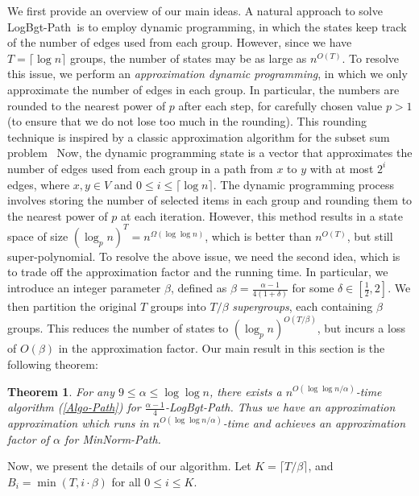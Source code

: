 \documentclass[11pt,a4paper]{article} \usepackage{enumitem}
\newcommand{\minnormpath}{\textsf{MinNorm-Path}}
\newcommand{\LBOpath}{\textsf{LogBgt-Path}}
\newtheorem{theorem}{Theorem}[section]
\theoremstyle{definition}
\begin{document}
We first provide an overview of our main ideas.
A natural approach to solve \LBOpath\ is to employ dynamic programming, 
in which the states keep track of the number of edges used from each group.
However, since we have $T=\lceil \log n\rceil$ groups, the number of states
may be as large as $n^{O(T)}$.
To resolve this issue, 
we perform an {\em approximation dynamic programming}, in which we only approximate the number of edges in each group. In particular, the numbers are rounded to the nearest power of \( p \) after each step, for carefully chosen value \( p > 1 \) 
(to ensure that we do not lose too much in the rounding).
This rounding technique is inspired by a classic approximation algorithm for the subset sum problem~\cite{10.1145/321906.321909}
Now, the dynamic programming state is a vector that approximates the number of edges used from each group in a path from \( x \) to \( y \) with at most \( 2^i \) edges, where \( x, y \in V \) and \( 0 \leq i \leq \lceil \log n \rceil \).
The dynamic programming process involves storing the number of selected items in each group and rounding them to the nearest power of \( p \) at each iteration. However, this method results in a state space of size \( (\log_p n)^{T} = n^{\Omega(\log \log n)} \), 
which is better than $n^{O(T)}$, but still super-polynomial. 
To resolve the above issue, we need the second idea, which is to trade off the approximation factor and the running time. 
In particular, we introduce an integer parameter \( \beta \), defined as $\beta = \frac{\alpha - 1}{4(1 + \delta)}$
for some \( \delta \in \left[ \frac{1}{2}, 2 \right] \). We then partition the original \( T \) groups into \( T/\beta \) {\em supergroups},
each containing \(\beta\) groups.
This reduces the number of states to $(\log_p n)^{O(T/\beta)}$, but incurs a loss of 
$O(\beta)$ in the approximation factor. Our main result in this section is the following theorem:

\begin{theorem}\label{thm:algo-path}
For any $9\le \alpha\le \log\log n$, there exists a $n^{O(\log\log n/\alpha)}$-time algorithm (\cref{Algo-Path}) for $\frac{\alpha-1}{4}$-\LBOpath. Thus we have an approximation approximation which runs in $n^{O(\log\log n/\alpha)}$-time 
and achieves an approximation factor of $\alpha$ for \minnormpath.
\end{theorem}


Now, we present the details of our algorithm.
Let $K=\lceil T/\beta \rceil$, and $B_i=\min (T,i\cdot \beta)$ for all $0\le i\le K$. 
\end{document}
